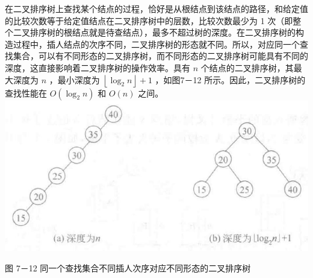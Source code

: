 \documentclass[10pt]{article}
\begin{document}
在二叉排序树上查找某个结点的过程，恰好是从根结点到该结点的路径，和给定值的比较次数等于给定值结点在二叉排序树中的层数，比较次数最少为 1 次（即整个二叉排序树的根结点就是待查结点），最多不超过树的深度。在二叉排序树的构造过程中，插人结点的次序不同，二叉排序树的形态就不同。所以，对应同一个查找集合，可以有不同形态的二叉排序树，而不同形态的二叉排序树可能具有不同的深度，这直接影响着二叉排序树的操作效率。具有 $n$ 个结点的二叉排序树，其最大深度为 $n$ ，最小深度为 $\left\lfloor\log _{2} n\right\rfloor+1$ ，如图7－12 所示。因此，二叉排序树的查找性能在 $O\left(\log _{2} n\right)$ 和 $O(n)$ 之间。\\
\includegraphics[max width=\textwidth, center]{2025_06_06_704745ea57b15b2333e5g-244(1)}

图 7－12 同一个查找集合不同插人次序对应不同形态的二叉排序树
\end{document}
